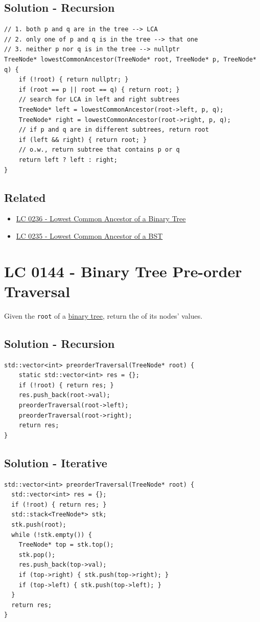 \subsection*{Solution - Recursion}
\begin{lstlisting}
// 1. both p and q are in the tree --> LCA
// 2. only one of p and q is in the tree --> that one
// 3. neither p nor q is in the tree --> nullptr
TreeNode* lowestCommonAncestor(TreeNode* root, TreeNode* p, TreeNode* q) {
	if (!root) { return nullptr; }
	if (root == p || root == q) { return root; }
	// search for LCA in left and right subtrees
	TreeNode* left = lowestCommonAncestor(root->left, p, q);
	TreeNode* right = lowestCommonAncestor(root->right, p, q);
	// if p and q are in different subtrees, return root
	if (left && right) { return root; }
	// o.w., return subtree that contains p or q
	return left ? left : right;
}
\end{lstlisting}

\subsection*{Related}
\begin{itemize}
	\item \hyperref[lc0236]{LC 0236 - Lowest Common Ancestor of a Binary Tree}
	\item \hyperref[lc0235]{LC 0235 - Lowest Common Ancestor of a BST}
\end{itemize}

\section{LC 0144 - Binary Tree Pre-order Traversal}
Given the {\colorbox{CodeBackground}{\lstinline|root|}} of a \ul{binary tree}, return the {\color{blue}{pre-order traversal}} of its nodes' values.

\subsection*{Solution - Recursion}
\begin{lstlisting}
std::vector<int> preorderTraversal(TreeNode* root) {
	static std::vector<int> res = {};
	if (!root) { return res; }
	res.push_back(root->val);
	preorderTraversal(root->left);
	preorderTraversal(root->right);
	return res;
}
\end{lstlisting}

\subsection*{Solution - Iterative}
\begin{lstlisting}
std::vector<int> preorderTraversal(TreeNode* root) {
  std::vector<int> res = {};
  if (!root) { return res; }
  std::stack<TreeNode*> stk;
  stk.push(root);
  while (!stk.empty()) {
    TreeNode* top = stk.top();
    stk.pop();
    res.push_back(top->val);
    if (top->right) { stk.push(top->right); }
    if (top->left) { stk.push(top->left); }
  }
  return res;
}
\end{lstlisting}

